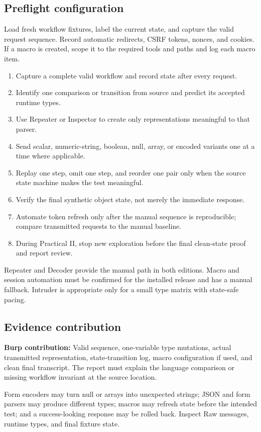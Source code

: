 \documentclass[11pt]{article}
\newcommand{\weekfield}[2]{%
  \Needspace{5\baselineskip}
  \subsection*{#1}
  #2
}
\newcommand{\burpevidence}[1]{\textbf{Burp contribution:} #1}
\begin{document}
\weekfield{Preflight configuration}{Load fresh workflow fixtures, label the
current state, and capture the valid request sequence. Record automatic redirects,
CSRF tokens, nonces, and cookies. If a macro is created, scope it to the required
tools and paths and log each macro item.}

\begin{procedurebox}
\begin{enumerate}
  \item Capture a complete valid workflow and record state after every request.
  \item Identify one comparison or transition from source and predict its accepted runtime types.
  \item Use Repeater or Inspector to create only representations meaningful to that parser.
  \item Send scalar, numeric-string, boolean, null, array, or encoded variants one at a time where applicable.
  \item Replay one step, omit one step, and reorder one pair only when the source state machine makes the test meaningful.
  \item Verify the final synthetic object state, not merely the immediate response.
  \item Automate token refresh only after the manual sequence is reproducible; compare transmitted requests to the manual baseline.
  \item During Practical II, stop new exploration before the final clean-state proof and report review.
\end{enumerate}
\end{procedurebox}

\begin{editionbox}
Repeater and Decoder provide the manual path in both editions. Macro and session
automation must be confirmed for the installed release and has a manual fallback.
Intruder is appropriate only for a small type matrix with state-safe pacing.
\end{editionbox}

\weekfield{Evidence contribution}{\burpevidence{Valid sequence, one-variable
type mutations, actual transmitted representation, state-transition log, macro
configuration if used, and clean final transcript.} The report must explain the
language comparison or missing workflow invariant at the source location.}

\begin{troubleshootingbox}
Form encoders may turn null or arrays into unexpected strings; JSON and form
parsers may produce different types; macros may refresh state before the intended
test; and a success-looking response may be rolled back. Inspect Raw messages,
runtime types, and final fixture state.
\end{troubleshootingbox}
\end{document}
